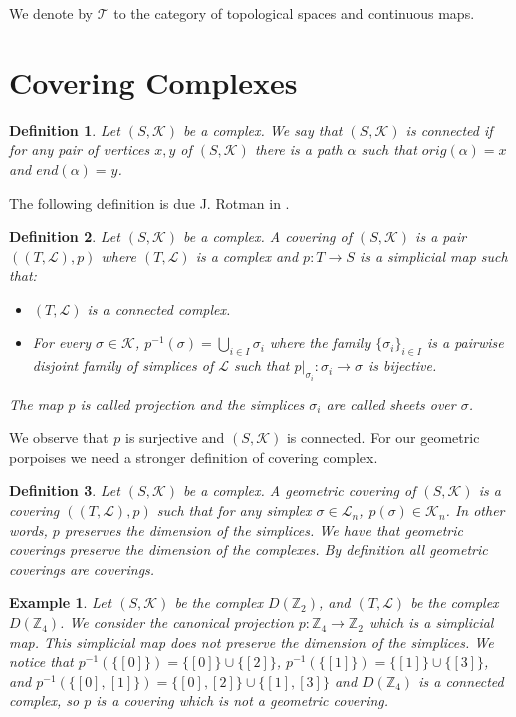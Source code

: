 \documentclass{amsart}
\newtheorem{definition}{Definition}[section]
\newtheorem{example}{Example}[section]
\begin{document}
We  denote by $\mathcal{T}$ to the category of topological spaces and continuous maps.


\section{Covering Complexes}


\begin{definition}
Let $(S,\mathcal{K})$ be a complex. We say that $(S,\mathcal{K})$ is connected if for any pair of vertices $x,y$ of $(S,\mathcal{K})$ there is a path $\alpha$ such that $orig(\alpha)=x$ and $end(\alpha)=y$.
\end{definition}

The following definition is due J. Rotman in \cite{rotman1973covering}.

\begin{definition}
Let $(S,\mathcal{K})$ be a complex. A covering of $(S,\mathcal{K})$ is a pair $((T,\mathcal{L}),p)$ where $(T,\mathcal{L})$ is a complex and $p\colon T\longrightarrow S$ is a simplicial map such that:
\begin{itemize}
\item $(T,\mathcal{L})$ is a connected complex.
\item For every $\sigma\in\mathcal{K}$, $p^{-1}(\sigma)=\bigcup_{i\in I}\sigma_i$ where the family $\{\sigma_i\}_{i\in I}$ is a pairwise disjoint family of simplices of $\mathcal{L}$ such that $p|_{\sigma_i}\colon \sigma_i\longrightarrow \sigma$ is bijective.
\end{itemize}
The map $p$ is called projection and the simplices $\sigma_i$ are called sheets over $\sigma$.
\end{definition}

We observe that $p$ is surjective and $(S,\mathcal{K})$ is connected. For our geometric porpoises we need a stronger definition of covering complex.

\begin{definition}
Let $(S,\mathcal{K})$ be a complex. A geometric covering of $(S,\mathcal{K})$ is a covering $((T,\mathcal{L}),p)$ such that for any simplex $\sigma\in\mathcal{L}_n$, $p(\sigma)\in\mathcal{K}_n$. In other words, $p$ preserves the dimension of the simplices. We have that geometric coverings preserve the dimension of the complexes. By definition all geometric coverings are coverings.
\end{definition}

\begin{example}
Let $(S,\mathcal{K})$ be the complex $D(\mathbb{Z}_2)$, and $(T,\mathcal{L})$ be the complex  $D(\mathbb{Z}_4)$. We consider the canonical projection $p\colon \mathbb{Z}_4\longrightarrow \mathbb{Z}_2$ which is a simplicial map. This simplicial map does not preserve the dimension of the simplices.  We notice that $p^{-1}(\{[0]\})=\{[0]\}\cup\{[2]\}$, $p^{-1}(\{[1]\})=\{[1]\}\cup\{[3]\}$, and $p^{-1}(\{[0],[1]\})=\{[0],[2]\}\cup\{[1],[3]\}$ and $D(\mathbb{Z}_4)$ is a connected complex, so $p$ is a covering which is not a geometric covering.
\end{example}
\end{document}
